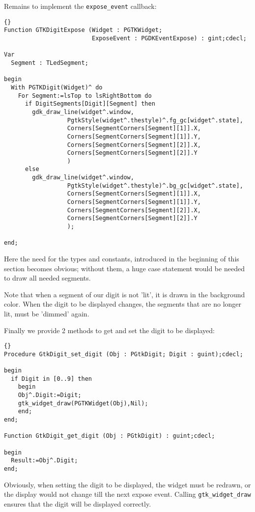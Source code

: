 \documentclass[10pt]{article}
\begin{document}
Remains to implement the \lstinline|expose_event| callback:
\begin{lstlisting}{}
Function GTKDigitExpose (Widget : PGTKWidget;
                         ExposeEvent : PGDKEventExpose) : gint;cdecl;

Var
  Segment : TLedSegment;
     
begin
  With PGTKDigit(Widget)^ do
    For Segment:=lsTop to lsRightBottom do 
      if DigitSegments[Digit][Segment] then
        gdk_draw_line(widget^.window,
                  PgtkStyle(widget^.thestyle)^.fg_gc[widget^.state],
                  Corners[SegmentCorners[Segment][1]].X,
                  Corners[SegmentCorners[Segment][1]].Y,
                  Corners[SegmentCorners[Segment][2]].X,
                  Corners[SegmentCorners[Segment][2]].Y
                  )
      else
        gdk_draw_line(widget^.window,
                  PgtkStyle(widget^.thestyle)^.bg_gc[widget^.state],
                  Corners[SegmentCorners[Segment][1]].X,
                  Corners[SegmentCorners[Segment][1]].Y,
                  Corners[SegmentCorners[Segment][2]].X,
                  Corners[SegmentCorners[Segment][2]].Y
                  );
  
end;
\end{lstlisting}
Here the need for the types and constants, introduced in the
beginning of this section becomes obvious; without them, a huge
case statement would be needed to draw all needed segments. 

Note that when a segment of our digit is not 'lit', it is drawn in the
background color. When the digit to be displayed changes, the segments 
that are no longer lit, must be 'dimmed' again.

Finally we provide 2 methods to get and set the digit to be displayed:
\begin{lstlisting}{}
Procedure GtkDigit_set_digit (Obj : PGtkDigit; Digit : guint);cdecl;

begin
  if Digit in [0..9] then
    begin
    Obj^.Digit:=Digit;
    gtk_widget_draw(PGTKWidget(Obj),Nil);
    end;
end;

Function GtkDigit_get_digit (Obj : PGtkDigit) : guint;cdecl;

begin
  Result:=Obj^.Digit;
end;  
\end{lstlisting}
Obviously, when setting the digit to be displayed, the widget must be
redrawn, or the display would not change till the next expose event. 
Calling \lstinline|gtk_widget_draw| ensures that the digit will be displayed
correctly. 
\end{document}
